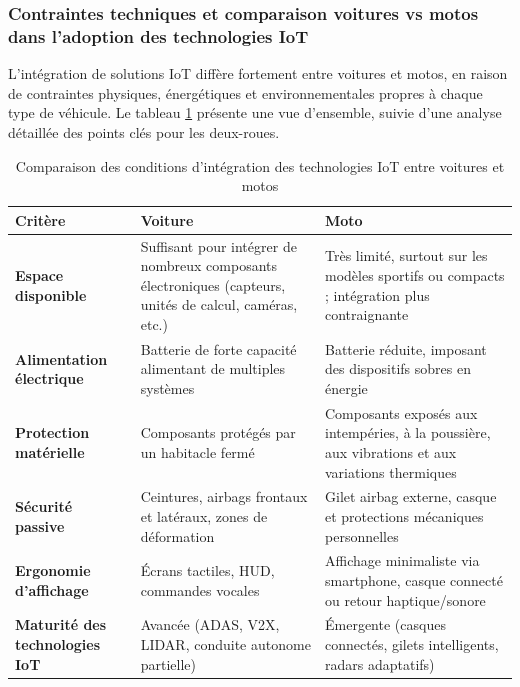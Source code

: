 \subsubsection{Contraintes techniques et comparaison voitures vs motos dans l’adoption des technologies IoT}

L’intégration de solutions IoT diffère fortement entre voitures et motos, en raison de contraintes physiques, énergétiques et environnementales propres à chaque type de véhicule. Le tableau \ref{tab:comparaison_iot_voiture_moto} présente une vue d’ensemble, suivie d’une analyse détaillée des points clés pour les deux-roues.

\begin{table}[H]
\centering
\caption{Comparaison des conditions d’intégration des technologies IoT entre voitures et motos}
\label{tab:comparaison_iot_voiture_moto}
\renewcommand{\arraystretch}{1.15}
\begin{tabular}{|p{3.2cm}|p{6.5cm}|p{6.5cm}|}
\hline
\textbf{Critère} & \textbf{Voiture} & \textbf{Moto} \\
\hline
\textbf{Espace disponible} &
Suffisant pour intégrer de nombreux composants électroniques (capteurs, unités de calcul, caméras, etc.) &
Très limité, surtout sur les modèles sportifs ou compacts ; intégration plus contraignante \\
\hline
\textbf{Alimentation électrique} &
Batterie de forte capacité alimentant de multiples systèmes &
Batterie réduite, imposant des dispositifs sobres en énergie \\
\hline
\textbf{Protection matérielle} &
Composants protégés par un habitacle fermé &
Composants exposés aux intempéries, à la poussière, aux vibrations et aux variations thermiques \\
\hline
\textbf{Sécurité passive} &
Ceintures, airbags frontaux et latéraux, zones de déformation &
Gilet airbag externe, casque et protections mécaniques personnelles \\
\hline
\textbf{Ergonomie d’affichage} &
Écrans tactiles, HUD, commandes vocales &
Affichage minimaliste via smartphone, casque connecté ou retour haptique/sonore \\
\hline
\textbf{Maturité des technologies IoT} &
Avancée (ADAS, V2X, LIDAR, conduite autonome partielle) &
Émergente (casques connectés, gilets intelligents, radars adaptatifs) \\
\hline
\end{tabular}
\end{table}

